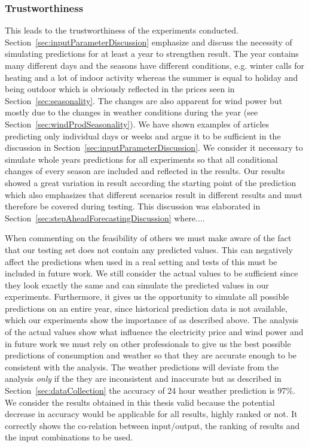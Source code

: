\subsubsection{Trustworthiness}
This leads to the trustworthiness of the experiments conducted. Section~\ref{sec:inputParameterDiscussion} emphasize and discuss the necessity of simulating predictions for at least a year to strengthen result. The year contains many different days and the seasons have different conditions, e.g. winter calls for heating and a lot of indoor activity whereas the summer is equal to holiday and being outdoor which is obviously reflected in the prices seen in Section~\ref{sec:seasonality}. The changes are also apparent for wind power but mostly due to the changes in weather conditions during the year (see Section~\ref{sec:windProdSeasonality}). We have shown examples of articles predicting only individual days or weeks and argue it to be sufficient in the discussion in Section~\ref{sec:inputParameterDiscussion}. We consider it necessary to simulate whole years predictions for all experiments so that all conditional changes of every season are included and reflected in the results. Our results showed a great variation in result according the starting point of the prediction which also emphasizes that different scenarios result in different results and must therefore be covered during testing. This discussion was elaborated in Section~\ref{sec:stepAheadForecastingDiscussion} where....  




When commenting on the feasibility of others we must make aware of the fact that our testing set does not contain any predicted values. This can negatively affect the predictions when used in a real setting and tests of this must be included in future work. We still consider the actual values to be sufficient since they look exactly the same and can simulate the predicted values in our experiments. Furthermore, it gives us the opportunity to simulate all possible predictions on an entire year, since historical prediction data is not available, which our experiments show the importance of as described above. The analysis of the actual values show what influence the electricity price and wind power and in future work we must rely on other professionals to give us the best possible predictions of consumption and weather so that they are accurate enough to be consistent with the analysis. The weather predictions will deviate from the analysis \emph{only} if the they are inconsistent and inaccurate but as described in Section~\ref{sec:dataCollection} the accuracy of 24 hour weather prediction is 97\%. We consider the results obtained in this thesis valid because the potential decrease in accuracy would be applicable for all results, highly ranked or not. It correctly shows the co-relation between input/output, the ranking of results and the input combinations to be used.

